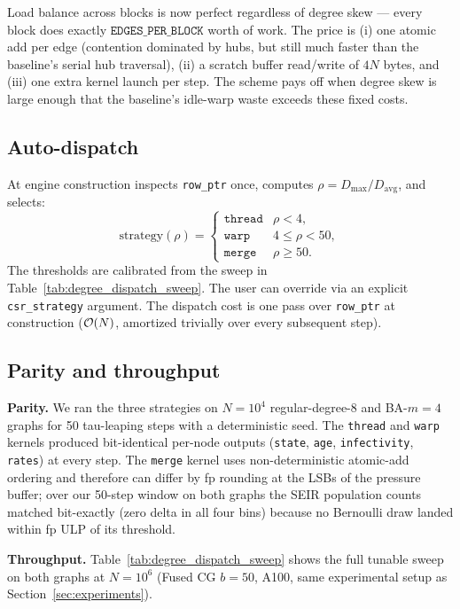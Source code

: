 Load balance across blocks is now perfect regardless of degree skew --- every block does exactly $\texttt{EDGES\_PER\_BLOCK}$ worth of work. The price is (i) one atomic add per edge (contention dominated by hubs, but still much faster than the baseline's serial hub traversal), (ii) a scratch buffer read/write of $4N$ bytes, and (iii) one extra kernel launch per step. The scheme pays off when degree skew is large enough that the baseline's idle-warp waste exceeds these fixed costs.

\subsection{Auto-dispatch}

At engine construction \flashspread{} inspects \texttt{row\_ptr} once, computes $\rho = D_{\max}/D_{\mathrm{avg}}$, and selects:
\begin{equation}
\text{strategy}(\rho) = \begin{cases}
\texttt{thread} & \rho < 4, \\
\texttt{warp}   & 4 \leq \rho < 50, \\
\texttt{merge}  & \rho \geq 50.
\end{cases}
\end{equation}
The thresholds are calibrated from the sweep in Table~\ref{tab:degree_dispatch_sweep}. The user can override via an explicit \texttt{csr\_strategy} argument. The dispatch cost is one pass over \texttt{row\_ptr} at construction ($\mathcal{O}(N)$, amortized trivially over every subsequent step).

\subsection{Parity and throughput}

\textbf{Parity.} We ran the three strategies on $N = 10^4$ regular-degree-8 and BA-$m{=}4$ graphs for 50 tau-leaping steps with a deterministic seed. The \texttt{thread} and \texttt{warp} kernels produced bit-identical per-node outputs (\texttt{state}, \texttt{age}, \texttt{infectivity}, \texttt{rates}) at every step. The \texttt{merge} kernel uses non-deterministic atomic-add ordering and therefore can differ by fp rounding at the LSBs of the pressure buffer; over our 50-step window on both graphs the SEIR population counts matched bit-exactly (zero delta in all four bins) because no Bernoulli draw landed within fp ULP of its threshold.

\textbf{Throughput.} Table~\ref{tab:degree_dispatch_sweep} shows the full tunable sweep on both graphs at $N = 10^6$ (Fused CG $b = 50$, A100, same experimental setup as Section~\ref{sec:experiments}).

